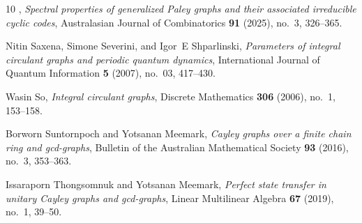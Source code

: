 \documentclass[12pt, a4paper]{amsart}
\theoremstyle{definition}
\numberwithin{equation}{section}
\begin{document}
\begin{thebibliography}{10}
\bysame, \emph{Spectral properties of generalized {Paley} graphs and their associated irreducible cyclic codes}, Australasian Journal of Combinatorics \textbf{91} (2025), no.~3, 326--365.

Nitin Saxena, Simone Severini, and Igor~E Shparlinski, \emph{Parameters of integral circulant graphs and periodic quantum dynamics}, International Journal of Quantum Information \textbf{5} (2007), no.~03, 417--430.

Wasin So, \emph{Integral circulant graphs}, Discrete Mathematics \textbf{306} (2006), no.~1, 153--158.

Borworn Suntornpoch and Yotsanan Meemark, \emph{Cayley graphs over a finite chain ring and gcd-graphs}, Bulletin of the Australian Mathematical Society \textbf{93} (2016), no.~3, 353--363.

Issaraporn Thongsomnuk and Yotsanan Meemark, \emph{Perfect state transfer in unitary {C}ayley graphs and gcd-graphs}, Linear Multilinear Algebra \textbf{67} (2019), no.~1, 39--50. 

\end{thebibliography}

%
%
\end{document}
